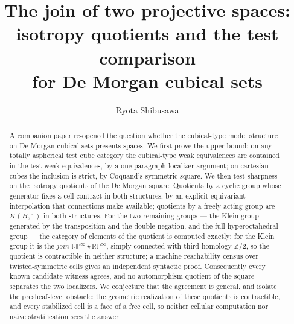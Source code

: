 \documentclass[11pt]{amsart}
\theoremstyle{definition}
\begin{document}
\title[Isotropy quotients and the test comparison]{The join of two
  projective spaces:\\ isotropy quotients and the test comparison\\
  for De Morgan cubical sets}

\author{Ryota Shibusawa}
\address{Daiichi Institute of Technology, Japan}


\begin{abstract}
  A companion paper re-opened the question whether the cubical-type
  model structure on De Morgan cubical sets presents spaces.  We
  first prove the upper bound: on any totally aspherical test cube
  category the cubical-type weak equivalences are contained in the
  test weak equivalences, by a one-paragraph localizer argument; on
  cartesian cubes the inclusion is strict, by Coquand's symmetric
  square.  We then test sharpness on the isotropy quotients of the
  De Morgan square.  Quotients by a cyclic group whose generator
  fixes a cell contract in both structures, by an explicit
  equivariant interpolation that connections make available;
  quotients by a freely acting group are $K(H,1)$ in both
  structures.  For the two remaining groups --- the Klein group
  generated by the transposition and the double negation, and the
  full hyperoctahedral group --- the category of elements of the
  quotient is computed exactly: for the Klein group it is the
  \emph{join} $\mathbb{RP}^\infty \star \mathbb{RP}^\infty$, simply
  connected with third homology $\mathbb{Z}/2$, so the quotient is
  contractible in neither structure; a machine reachability census
  over twisted-symmetric cells gives an independent syntactic proof.
  Consequently every known candidate witness agrees, and no
  automorphism quotient of the square separates the two localizers.
  We conjecture that the agreement is general, and isolate the
  presheaf-level obstacle: the geometric realization of these
  quotients is contractible, and every stabilized cell is a face of
  a free cell, so neither cellular computation nor na\"ive
  stratification sees the answer.
\end{abstract}

\maketitle
\end{document}
